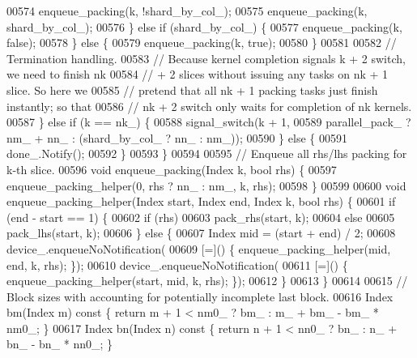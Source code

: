 \begin{DoxyCode}
00574           enqueue\_packing(k, !shard\_by\_col\_);
00575           enqueue\_packing(k, shard\_by\_col\_);
00576         \} \textcolor{keywordflow}{else} \textcolor{keywordflow}{if} (shard\_by\_col\_) \{
00577           enqueue\_packing(k, \textcolor{keyword}{false});
00578         \} \textcolor{keywordflow}{else} \{
00579           enqueue\_packing(k, \textcolor{keyword}{true});
00580         \}
00581 
00582         \textcolor{comment}{// Termination handling.}
00583         \textcolor{comment}{// Because kernel completion signals k + 2 switch, we need to finish nk}
00584         \textcolor{comment}{// + 2 slices without issuing any tasks on nk + 1 slice. So here we}
00585         \textcolor{comment}{// pretend that all nk + 1 packing tasks just finish instantly; so that}
00586         \textcolor{comment}{// nk + 2 switch only waits for completion of nk kernels.}
00587       \} \textcolor{keywordflow}{else} \textcolor{keywordflow}{if} (k == nk\_) \{
00588         signal\_switch(k + 1,
00589                       parallel\_pack\_ ? nm\_ + nn\_ : (shard\_by\_col\_ ? nn\_ : nm\_));
00590       \} \textcolor{keywordflow}{else} \{
00591         done\_.Notify();
00592       \}
00593     \}
00594 
00595     \textcolor{comment}{// Enqueue all rhs/lhs packing for k-th slice.}
00596     \textcolor{keywordtype}{void} enqueue\_packing(Index k, \textcolor{keywordtype}{bool} rhs) \{
00597       enqueue\_packing\_helper(0, rhs ? nn\_ : nm\_, k, rhs);
00598     \}
00599 
00600     \textcolor{keywordtype}{void} enqueue\_packing\_helper(Index start, Index end, Index k, \textcolor{keywordtype}{bool} rhs) \{
00601       \textcolor{keywordflow}{if} (end - start == 1) \{
00602         \textcolor{keywordflow}{if} (rhs)
00603           pack\_rhs(start, k);
00604         \textcolor{keywordflow}{else}
00605           pack\_lhs(start, k);
00606       \} \textcolor{keywordflow}{else} \{
00607         Index mid = (start + end) / 2;
00608         device\_.enqueueNoNotification(
00609             [=]() \{ enqueue\_packing\_helper(mid, end, k, rhs); \});
00610         device\_.enqueueNoNotification(
00611             [=]() \{ enqueue\_packing\_helper(start, mid, k, rhs); \});
00612       \}
00613     \}
00614 
00615     \textcolor{comment}{// Block sizes with accounting for potentially incomplete last block.}
00616     Index bm(Index m)\textcolor{keyword}{ const }\{ \textcolor{keywordflow}{return} m + 1 < nm0\_ ? bm\_ : m\_ + bm\_ - bm\_ * nm0\_; \}
00617     Index bn(Index n)\textcolor{keyword}{ const }\{ \textcolor{keywordflow}{return} n + 1 < nn0\_ ? bn\_ : n\_ + bn\_ - bn\_ * nn0\_; \}

\end{DoxyCode}
